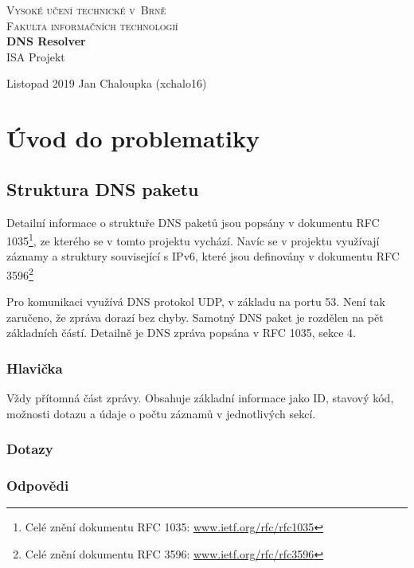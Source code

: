 \documentclass[a4paper,12pt]{article}
\begin{document}
\begin{titlepage}
	\begin{center}
		{
			\LARGE\textsc{Vysoké učení technické v~Brně}\\
			\Large\textsc{Fakulta informačních technologií}\\
		}
		{
			\textbf{\Huge DNS Resolver}\\
			\vspace{3mm}
			\LARGE ISA Projekt\\
		}
	\end{center}
	{\large Listopad 2019 \hfill Jan Chaloupka (xchalo16)}
\end{titlepage}
\tableofcontents
\newpage

\section{Úvod do problematiky}
\subsection{Struktura DNS paketu}
Detailní informace o struktuře DNS paketů jsou popsány v dokumentu RFC 1035\footnote{Celé znění dokumentu RFC 1035: \url{www.ietf.org/rfc/rfc1035}}, ze kterého se v tomto projektu vychází. Navíc se v projektu využívají záznamy a struktury související s IPv6, které jsou definovány v dokumentu RFC 3596\footnote{Celé znění dokumentu RFC 3596: \url{www.ietf.org/rfc/rfc3596}}

Pro komunikaci využívá DNS protokol UDP, v základu na portu 53. Není tak zaručeno, že zpráva dorazí bez chyby. Samotný DNS paket je rozdělen na pět základních částí. Detailně je DNS zpráva popsána v RFC 1035, sekce 4.

\subsubsection{Hlavička}
Vždy přítomná část zprávy. Obsahuje základní informace jako ID, stavový kód, možnosti dotazu a údaje o počtu záznamů v jednotlivých sekcí.

\subsubsection{Dotazy}

\subsubsection{Odpovědi}
\end{document}
